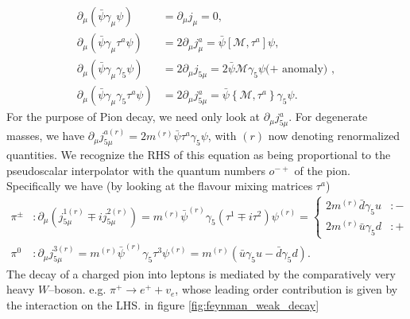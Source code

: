\documentclass[a4paper,10pt]{article}
\begin{document}
\begin{equation}\label{eq:Ward_identities}
\begin{aligned}
\partial_{\mu}\left(\bar{\psi} \gamma_{\mu} \psi\right) &=\partial_{\mu}j_\mu=0, \\
\partial_{\mu}\left(\bar{\psi} \gamma_{\mu} \tau^{a} \psi\right) &=2\partial_{\mu}j_\mu^a=\bar{\psi}\left[\mathcal{M}, \tau^{a}\right] \psi, \\
\partial_{\mu}\left(\bar{\psi} \gamma_{\mu} \gamma_{5} \psi\right) &=2\partial_{\mu}j_{5\mu}=2 \bar{\psi} \mathcal{M} \gamma_{5} \psi(+\text { anomaly) },\\
\partial_{\mu}\left(\bar{\psi} \gamma_{\mu} \gamma_{5} \tau^{a} \psi\right) &=2\partial_{\mu}j_{5\mu}^a=\bar{\psi}\left\{\mathcal{M}, \tau^{a}\right\} \gamma_{5} \psi.
\end{aligned}
\end{equation}
For the purpose of Pion decay, we need only look at $\partial_{\mu}j_{5\mu}^a$. For degenerate masses, we have $\partial_{\mu}j_{5\mu}^{a(r)} = 2m^{(r)}\bar{\psi}\tau^{a}\gamma_{5} \psi$, with $(r)$ now denoting renormalized quantities. We recognize the RHS of this equation as being proportional to the pseudoscalar interpolator with the quantum numbers $o^{-+}$ of the pion. Specifically we have (by looking at the flavour mixing matrices $\tau^a$)
\begin{equation}
\begin{aligned}
\pi^{\pm}&: \partial_\mu \left( j_{5\mu}^{1(r)} \mp ij_{5\mu}^{2(r)}\right) = m^{(r)}\bar{\psi}^{(r)} \gamma_5\left(\tau^1 \mp i\tau^2 \right)\psi^{(r)} = \begin{cases} 
      2m^{(r)}\bar{d}\gamma_5u & :- \\
      2m^{(r)}\bar{u}\gamma_5d & :+
   \end{cases}\\ \pi^{0}&: \partial_\mu j_{5\mu}^{3(r)} = m^{(r)}\bar{\psi}^{(r)} \gamma_5\tau^3\psi^{(r)} =m^{(r)}\left( \bar{u}\gamma_5u-\bar{d}\gamma_5d \right).
\end{aligned}
\end{equation}
The decay of a charged pion into leptons is mediated by the comparatively very heavy $W$--boson. e.g. $\pi^{+} \rightarrow e^{+}+v_{e}$, whose leading order contribution is given by the interaction on the LHS. in figure \ref{fig:feynman_weak_decay}
\end{document}
